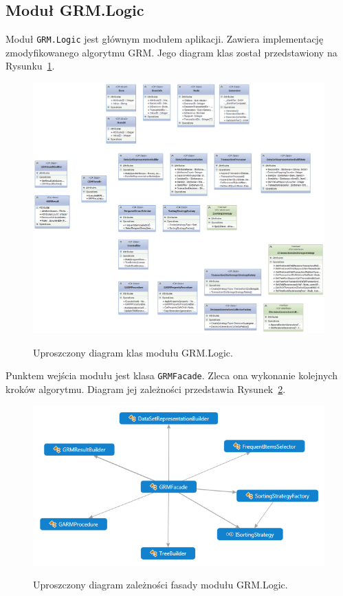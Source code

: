 \documentclass[a4paper,10pt]{article}
\begin{document}
 \subsection{Moduł GRM.Logic}
 Moduł \verb+GRM.Logic+ jest głównym modułem aplikacji.
 Zawiera implementację zmodyfikowanego algorytmu GRM.
 Jego diagram klas został przedstawiony na Rysunku~\ref{fig:diag:log:class}.

 \begin{figure}[!ht]
  \begin{center}
   \scalebox{0.42}
   {
    \includegraphics{../diagrams/Logic_class_diagram.png}
   }
  \end{center}
  \caption{
   Uproszczony diagram klas modułu GRM.Logic.
  }
  \label{fig:diag:log:class}
 \end{figure}
  
 Punktem wejścia modułu jest klasa \verb+GRMFacade+.
 Zleca ona wykonanie kolejnych kroków algorytmu.
 Diagram jej zależności przedstawia Rysunek~\ref{fig:diag:log:Facade}.
 
 \begin{figure}[!ht]
  \begin{center}
   \scalebox{0.7}
   {
    \includegraphics{../diagrams/GRMFacade_dependency_diagram.png}
   }
  \end{center}
  \caption{
   Uproszczony diagram zależności fasady modułu GRM.Logic.
  }
  \label{fig:diag:log:Facade}
 \end{figure}
 
\end{document}
